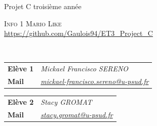 ﻿\begin{titlepage}
\begin{minipage}[t]{0.4\textwidth}
	\begin{flushleft}
	\hspace{0.1cm}Projet C troisième année\\
	\end{flushleft}
\end{minipage}\hfill
\begin{minipage}[t]{0.4\textwidth}
	\begin{flushright}
	\textsc{Info 1}
	\textsc{Mario Like} \\
	\href{https://github.com/Gaulois94/ET3\_Project\_C/}{https://github.com/Gaulois94/ET3\_Project\_C}
	\end{flushright}
\end{minipage} ~\\[1cm]

\begin{minipage}[t]{0.5\textwidth}
	\begin{flushleft}
		\begin{tabular}{>{\bfseries}l@{:}>{\itshape}l}
		Elève 1 & Mickael Francisco SERENO\\
		Mail & \href{mailto:mickael-francisco.sereno@u-psud.fr}{mickael-francisco.sereno@u-psud.fr}\\
		\end{tabular}
	\end{flushleft}
\end{minipage}\hfill
\begin{minipage}[t]{0.4\textwidth}
	\begin{flushright}
		\begin{tabular}{>{\bfseries}l@{:}>{\itshape}l}
		Elève 2 & Stacy GROMAT\\
		Mail & \href{mailto:stacy.gromat@u-psud.fr}{stacy.gromat@u-psud.fr}\\
		\end{tabular}
	\end{flushright}
\end{minipage}\hfill


\end{titlepage}
